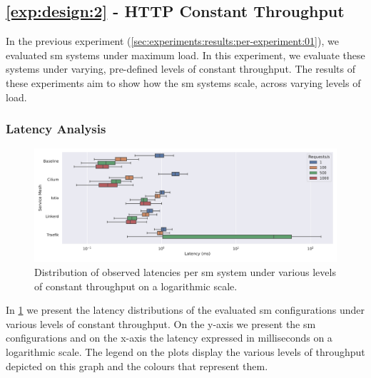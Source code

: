 \subsection{\ref{exp:design:2} - HTTP Constant Throughput}
\label{sec:experiments:results:per-experiment:02}

In the previous experiment (\cref{sec:experiments:results:per-experiment:01}), we evaluated \gls{sm} systems under maximum load. In this experiment, we evaluate these systems under varying, pre-defined levels of constant throughput. The results of these experiments aim to show how the \gls{sm} systems scale, across varying levels of load.

\subsubsection{Latency Analysis}
\label{sec:experiments:results:per-experiment:02:latency}

\begin{figure}[!t]
    \centering
    
    \includegraphics[width=1\linewidth]{5_experimental_evaluation/figures/exp-02-latency-log.pdf}
    
    \caption[Distribution of observed latencies per \gls{sm} system under various levels of constant throughput]{Distribution of observed latencies per \gls{sm} system under various levels of constant throughput on a logarithmic scale.}
    
    \label{fig:exp:02:latency-distributions}
\end{figure}


In \cref{fig:exp:02:latency-distributions} we present the latency distributions of the evaluated \gls{sm} configurations under various levels of constant throughput.  On the y-axis we present the \gls{sm} configurations and on the x-axis the latency expressed in milliseconds on a logarithmic scale. The legend on the plots display the various levels of throughput depicted on this graph and the colours that represent them.

